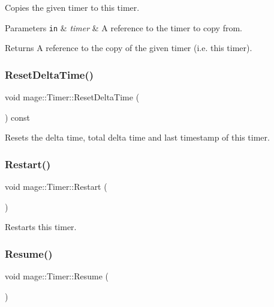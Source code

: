 Copies the given timer to this timer.


\begin{DoxyParams}[1]{Parameters}
\mbox{\tt in}  & {\em timer} & A reference to the timer to copy from. \\
\hline
\end{DoxyParams}
\begin{DoxyReturn}{Returns}
A reference to the copy of the given timer (i.\+e. this timer). 
\end{DoxyReturn}
\hypertarget{classmage_1_1_timer_af9f185515128afd02ff36ac36f665552}{}\label{classmage_1_1_timer_af9f185515128afd02ff36ac36f665552} 
\subsubsection{\texorpdfstring{Reset\+Delta\+Time()}{ResetDeltaTime()}}
{\footnotesize\ttfamily void mage\+::\+Timer\+::\+Reset\+Delta\+Time (\begin{DoxyParamCaption}{ }\end{DoxyParamCaption}) const\hspace{0.3cm}{\ttfamily [private]}}

Resets the delta time, total delta time and last timestamp of this timer. \hypertarget{classmage_1_1_timer_a4e1ba19d02c290a18981db1766f006c3}{}\label{classmage_1_1_timer_a4e1ba19d02c290a18981db1766f006c3} 
\subsubsection{\texorpdfstring{Restart()}{Restart()}}
{\footnotesize\ttfamily void mage\+::\+Timer\+::\+Restart (\begin{DoxyParamCaption}{ }\end{DoxyParamCaption})}

Restarts this timer. \hypertarget{classmage_1_1_timer_a4d0e1c3bdeb93951c9332231be876d29}{}\label{classmage_1_1_timer_a4d0e1c3bdeb93951c9332231be876d29} 
\subsubsection{\texorpdfstring{Resume()}{Resume()}}
{\footnotesize\ttfamily void mage\+::\+Timer\+::\+Resume (\begin{DoxyParamCaption}{ }\end{DoxyParamCaption})}


